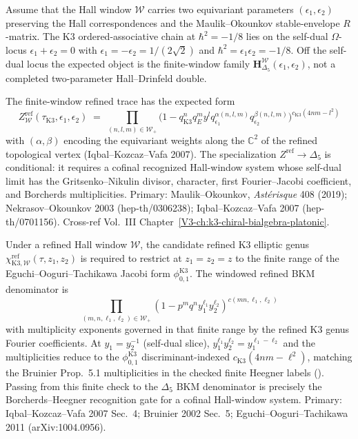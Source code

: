 \begin{remark}
\label{rem:v2-oackd-refined-omega-two-param}
Assume that the Hall window $\mathcal W$ carries two equivariant
parameters $(\epsilon_1,\epsilon_2)$ preserving the Hall correspondences
and the Maulik--Okounkov stable-envelope $R$-matrix.  The K3
ordered-associative chain at $\hbar^2=-1/8$ lies on the self-dual
$\Omega$-locus $\epsilon_1+\epsilon_2=0$ with
$\epsilon_1=-\epsilon_2=1/(2\sqrt2)$ and
$\hbar^2=\epsilon_1\epsilon_2=-1/8$.  Off the self-dual locus the
expected object is the finite-window family
$\mathbf H_{\Delta_5}^{\mathcal W}(\epsilon_1,\epsilon_2)$, not a
completed two-parameter Hall--Drinfeld double.

The finite-window refined trace has the expected form
\[
Z^{\mathrm{ref}}_{\mathcal W}(\tau_{\mathrm K3}, \epsilon_1, \epsilon_2)
 \;=\; \prod_{(n, l, m)\in \mathcal W_+}
 \bigl(1 - q_{\mathrm{K3}}^n q_E^m y^l q_{\epsilon_1}^{\alpha(n,l,m)}
 q_{\epsilon_2}^{\beta(n,l,m)}\bigr)^{c_{\mathrm K3}(4nm - l^2)}
\]
with $(\alpha, \beta)$ encoding the equivariant weights along the
$\mathbb C^2$ of the refined topological vertex (Iqbal--Kozcaz--Vafa
2007).  The specialization $Z^{\mathrm{ref}}\to\Delta_5$ is conditional:
it requires a cofinal recognized Hall-window system whose self-dual
limit has the Gritsenko--Nikulin divisor, character, first
Fourier--Jacobi coefficient, and Borcherds multiplicities.
Primary: Maulik--Okounkov, \emph{Ast\'erisque} 408 (2019);
Nekrasov--Okounkov 2003 (hep-th/0306238); Iqbal--Kozcaz--Vafa 2007
(hep-th/0701156). Cross-ref Vol.~III
Chapter~\ref{V3-ch:k3-chiral-bialgebra-platonic}.
\end{remark}

\begin{remark}
\label{rem:v2-oackd-refined-bkm-product}
Under a refined Hall window $\mathcal W$, the candidate refined K3
elliptic genus
$\chi_{\mathrm{K3},\mathcal W}^{\mathrm{ref}}(\tau,z_1,z_2)$ is required
to restrict at $z_1=z_2=z$ to the finite range of the
Eguchi--Ooguri--Tachikawa Jacobi form $\phi_{0,1}^{\mathrm{K3}}$. The
windowed refined BKM denominator is
\[
\prod_{(m, n, \ell_1, \ell_2)\in \mathcal W_+}
 (1 - p^m q^n y_1^{\ell_1} y_2^{\ell_2})^{c(mn, \ell_1, \ell_2)}
\]
with multiplicity exponents governed in that finite range by the
refined K3 genus Fourier coefficients. At $y_1 = y_2^{-1}$ (self-dual
slice), $y_1^{\ell_1} y_2^{\ell_2}
= y_1^{\ell_1 - \ell_2}$ and the multiplicities reduce to the
$\phi_{0,1}^{\mathrm K3}$ discriminant-indexed $c_{\mathrm K3}(4nm - \ell^2)$,
matching the Bruinier Prop.~5.1 multiplicities in the checked finite
Heegner labels (\cite[Prop.~5.1]{Bruinier2002}). Passing from this
finite check to the $\Delta_5$ BKM denominator is precisely the
Borcherds--Heegner recognition gate for a cofinal Hall-window system.
Primary: Iqbal--Kozcaz--Vafa 2007 Sec.~4;
Bruinier 2002 Sec.~5; Eguchi--Ooguri--Tachikawa 2011 (arXiv:1004.0956).
\end{remark}


